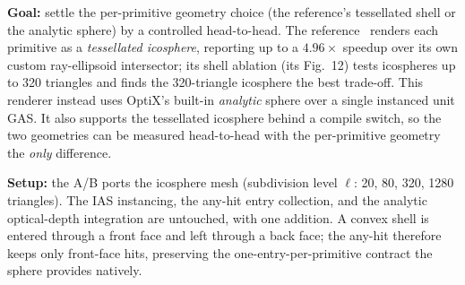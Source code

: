 \textbf{Goal:} settle the per-primitive geometry choice (the reference's tessellated shell or the
analytic sphere) by a controlled head-to-head.
The reference~\cite{DSYG} renders each primitive as a \emph{tessellated icosphere}, reporting up to a $4.96\times$ speedup over its own custom ray-ellipsoid intersector; its
shell ablation (its Fig.~12) tests icospheres up to \num{320} triangles and finds the
\num{320}-triangle icosphere the best trade-off. This renderer instead uses OptiX's built-in \emph{analytic} sphere
over a single instanced unit GAS. It also supports the tessellated icosphere behind a compile switch,
so the two geometries can be measured head-to-head with the per-primitive geometry the \emph{only}
difference.

\textbf{Setup:} the A/B ports the icosphere mesh (subdivision level $\ell$: \num{20}, \num{80}, \num{320},
\num{1280} triangles). The IAS instancing, the any-hit entry collection,
and the analytic optical-depth integration are untouched, with one addition. A convex shell is
entered through a front face and left through a back face; the any-hit therefore keeps only
front-face hits, preserving the one-entry-per-primitive contract the sphere provides natively.

